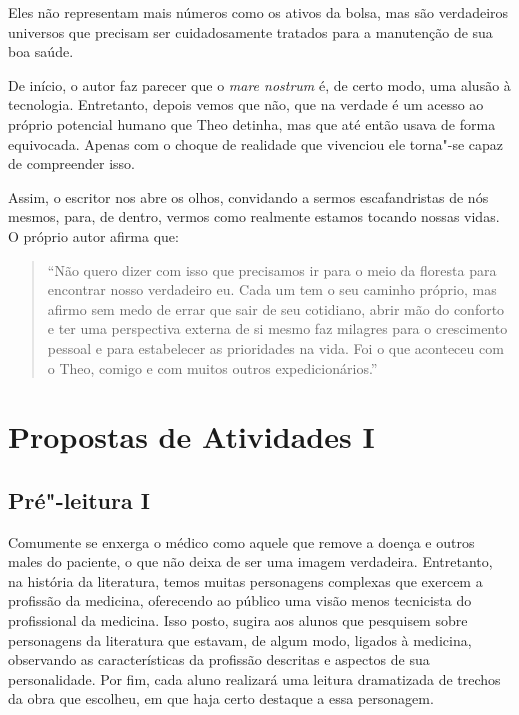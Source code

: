 \documentclass[12pt]{extarticle}
\begin{document}
Eles não representam mais números como os ativos da bolsa, mas são verdadeiros
universos que precisam ser cuidadosamente tratados para a manutenção de sua boa
saúde.
 
De início, o autor faz parecer que o \emph{mare nostrum} é, de certo modo, uma alusão
à tecnologia. Entretanto, depois vemos que não, que na verdade é um acesso ao próprio
potencial humano que Theo detinha, mas que até então usava de forma
equivocada. Apenas com o choque de realidade que vivenciou ele torna"-se capaz de compreender
isso.

Assim, o escritor nos abre os olhos, convidando a sermos escafandristas de
nós mesmos, para, de dentro, vermos como realmente estamos tocando nossas
vidas. O próprio autor afirma que: 

\begin{quote}
``Não quero dizer com isso que precisamos ir para
o meio da floresta  para encontrar nosso verdadeiro eu. 
Cada um tem o seu caminho próprio, mas afirmo sem medo de errar que sair de
seu cotidiano, abrir mão do conforto e ter uma perspectiva externa de si mesmo
faz milagres para o crescimento pessoal e para estabelecer as prioridades na
vida. Foi o que aconteceu com o Theo, comigo e com muitos outros expedicionários.''
\end{quote}

\section{Propostas de Atividades I}

\subsection{Pré"-leitura I}


Comumente se enxerga o médico como aquele que remove a doença e outros males do
paciente, o que não deixa de ser uma imagem verdadeira. Entretanto, na história da literatura,
temos muitas personagens complexas que exercem a profissão da medicina,
oferecendo ao público uma visão menos tecnicista do profissional da medicina.
Isso posto, sugira aos alunos que pesquisem sobre personagens da literatura que
estavam, de algum modo, ligados à medicina, observando as características da
profissão descritas e aspectos de sua personalidade. Por fim, cada aluno
realizará uma leitura dramatizada de trechos da obra que escolheu, em que haja
certo destaque a essa personagem.
\end{document}

